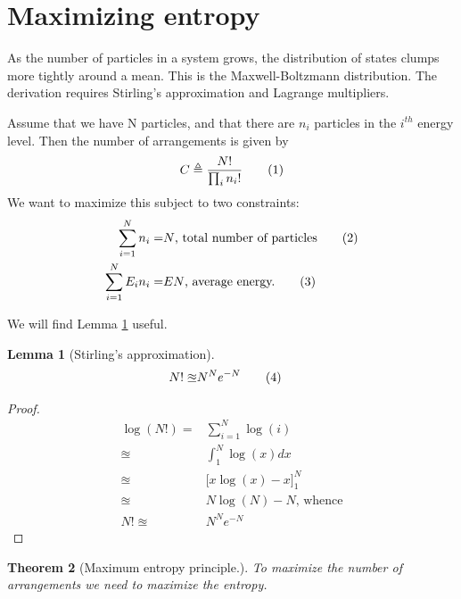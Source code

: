 \documentclass[]{article}
\newcommand\numberthis{\addtocounter{equation}{1}\tag{\theequation}}
\newtheorem{thm}{Theorem}
\newtheorem{lemma}[thm]{Lemma}
\begin{document}
\section{Maximizing entropy}

As the number of particles in a system grows, the distribution of states clumps more tightly around a mean. This is the Maxwell-Boltzmann distribution. The derivation requires Stirling's approximation and Lagrange multipliers.

Assume that we have N particles, and that there are $n_i$ particles in the $i^{th}$ energy level. Then the number of arrangements is given by
\begin{align*}
C\triangleq\frac{N!}{\prod_{i}n_i!} \numberthis \label{eq:number:combinations}
\end{align*}
 We want to maximize this subject to two constraints:
\begin{align*}
\sum_{i=1}^{N} n_i =& N \text{, total number of particles} \numberthis\label{eq:sum:probilities}\\
\sum_{i=1}^{N} E_i n_i =& E N \text{, average energy.}\numberthis\label{eq:total:energy}
\end{align*}

We will find Lemma \ref{lemma:Stirling} useful.
\begin{lemma}[Stirling's approximation]\label{lemma:Stirling}
	\begin{align*}
	N! \approxeq& N^N e^{-N}\numberthis\label{eq:stirling}
	\end{align*}
\end{lemma}

\begin{proof}
	\begin{align*}
	\log(N!) =& \sum_{i=1}^{N}\log (i)\\
	\approxeq &\int_{1}^{N} \log(x) dx\\
	\approxeq& \big[x \log(x) - x \big]_1^N\\
	\approxeq& N\log(N)-N\text{, whence} \\
	N! \approxeq& N^N e^{-N}
	\end{align*}
\end{proof}	

\begin{thm}[Maximum entropy principle.]
	To maximize the number of arrangements we need to maximize the entropy.
\end{thm}
\end{document}

